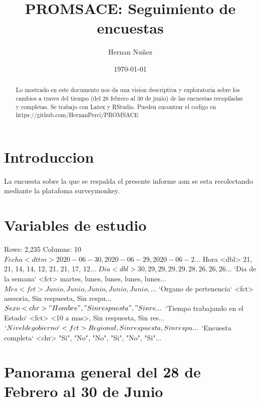 \documentclass{article}
\begin{document}

\title{PROMSACE: Seguimiento de encuestas}
\author{Hernan Nuñez}
\date{\today}
\maketitle
\begin{abstract}
Lo mostrado en este documento nos da una vision descriptiva y exploratoria sobre los cambios a traves del tiempo (del 28 febrero al 30 de junio) de las encuestas recopiladas y completas. Se trabajo con Latex y RStudio. Pueden encontrar el codigo en https://github.com/HernanPerci/PROMSACE
\end{abstract}

\tableofcontents

\section{Introduccion}
La encuesta sobre la que se respalda el presente informe aun se esta recolectando mediante la platafoma surveymonkey.

\section{Variables de estudio}


\begin{Schunk}
\begin{Soutput}
Rows: 2,235
Columns: 10
$ Fecha                            <dttm> 2020-06-30, 2020-06-29, 2020-06-2...
$ Hora                             <dbl> 21, 21, 14, 14, 12, 21, 21, 17, 12...
$ Dia                              <dbl> 30, 29, 29, 29, 29, 28, 26, 26, 26...
$ `Dia de la semana`               <fct> martes, lunes, lunes, lunes, lunes...
$ Mes                              <fct> Junio, Junio, Junio, Junio, Junio,...
$ `Organo de pertenencia`          <fct> asesoria, Sin respuesta, Sin respu...
$ Sexo                             <chr> "Hombre", "Sin respuesta", "Sin re...
$ `Tiempo trabajando en el Estado` <fct> <10 a mas>, Sin respuesta, Sin res...
$ `Nivel de gobierno`              <fct> Regional, Sin respuesta, Sin respu...
$ `Encuesta completa`              <chr> "Si", "No", "No", "Si", "No", "Si"...
\end{Soutput}
\end{Schunk}

\section{Panorama general del 28 de Febrero al 30 de Junio}
\end{document}
